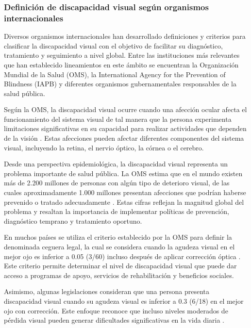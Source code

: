 \subsubsection{Definición de discapacidad visual según organismos internacionales}
Diversos organismos internacionales han desarrollado definiciones y criterios para clasificar la discapacidad visual con el objetivo de facilitar su diagnóstico, tratamiento y seguimiento a nivel global. Entre las instituciones más relevantes que han establecido lineamientos en este ámbito se encuentran la Organización Mundial de la Salud (OMS), la International Agency for the Prevention of Blindness (IAPB) y diferentes organismos gubernamentales responsables de la salud pública.

Según la OMS, la discapacidad visual ocurre cuando una afección ocular afecta el funcionamiento del sistema visual de tal manera que la persona experimenta limitaciones significativas en su capacidad para realizar actividades que dependen de la visión \cite{who_blindness2026}. Estas afecciones pueden afectar diferentes componentes del sistema visual, incluyendo la retina, el nervio óptico, la córnea o el cerebro.

Desde una perspectiva epidemiológica, la discapacidad visual representa un problema importante de salud pública. La OMS estima que en el mundo existen más de 2.200 millones de personas con algún tipo de deterioro visual, de las cuales aproximadamente 1.000 millones presentan afecciones que podrían haberse prevenido o tratado adecuadamente \cite{who_blindness2026}. Estas cifras reflejan la magnitud global del problema y resaltan la importancia de implementar políticas de prevención, diagnóstico temprano y tratamiento oportuno.

En muchos países se utiliza el criterio establecido por la OMS para definir la denominada ceguera legal, la cual se considera cuando la agudeza visual en el mejor ojo es inferior a 0.05 (3/60) incluso después de aplicar corrección óptica \cite{once_bajavision}. Este criterio permite determinar el nivel de discapacidad visual que puede dar acceso a programas de apoyo, servicios de rehabilitación y beneficios sociales.

Asimismo, algunas legislaciones consideran que una persona presenta discapacidad visual cuando su agudeza visual es inferior a 0.3 (6/18) en el mejor ojo con corrección. Este enfoque reconoce que incluso niveles moderados de pérdida visual pueden generar dificultades significativas en la vida diaria \cite{once_bajavision}.

